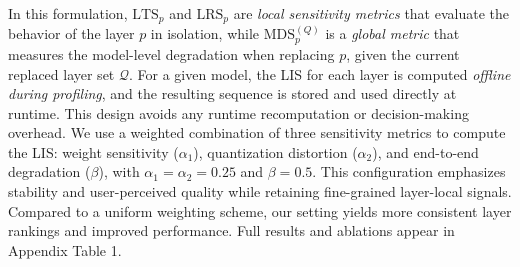 \documentclass{article}
\begin{document}
In this formulation, $\mathrm{LTS}_p$ and $\mathrm{LRS}_p$ are \textit{local sensitivity metrics} that evaluate the behavior of the layer $p$ in isolation, while $\mathrm{MDS}^{(Q)}_p$ is a \textit{global metric} that measures the model-level degradation when replacing $p$, given the current replaced layer set $\mathcal{Q}$. For a given model, the LIS for each layer is computed \textit{offline during profiling}, and the resulting sequence is stored and used directly at runtime. This design avoids any runtime recomputation or decision-making overhead.
We use a weighted combination of three sensitivity metrics to compute the LIS: weight sensitivity ({$\alpha_1$}), quantization distortion ({$\alpha_2$}), and end-to-end degradation ({$\beta$}), with $\alpha_1=\alpha_2=0.25$ and $\beta=0.5$. This configuration emphasizes stability and user-perceived quality while retaining fine-grained layer-local signals. Compared to a uniform weighting scheme, our setting yields more consistent layer rankings and improved performance. Full results and ablations appear in {Appendix} Table 1.
\end{document}
